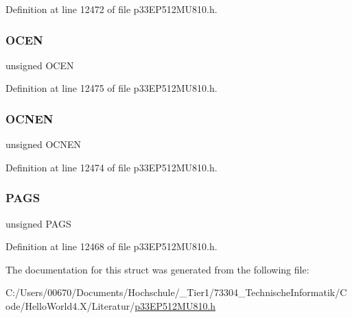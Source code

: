 Definition at line 12472 of file p33\+E\+P512\+M\+U810.\+h.

\mbox{\label{structtag_c_m2_m_s_k_c_o_n_b_i_t_s_ad7c118cfef34dec7ba06f5968b47200c}} 
\subsubsection{\texorpdfstring{O\+C\+EN}{OCEN}}
{\footnotesize\ttfamily unsigned O\+C\+EN}



Definition at line 12475 of file p33\+E\+P512\+M\+U810.\+h.

\mbox{\label{structtag_c_m2_m_s_k_c_o_n_b_i_t_s_a8bee27f84106873154bb0f1b9d244ebd}} 
\subsubsection{\texorpdfstring{O\+C\+N\+EN}{OCNEN}}
{\footnotesize\ttfamily unsigned O\+C\+N\+EN}



Definition at line 12474 of file p33\+E\+P512\+M\+U810.\+h.

\mbox{\label{structtag_c_m2_m_s_k_c_o_n_b_i_t_s_af5feed07d2e415c635200336f0f05e41}} 
\subsubsection{\texorpdfstring{P\+A\+GS}{PAGS}}
{\footnotesize\ttfamily unsigned P\+A\+GS}



Definition at line 12468 of file p33\+E\+P512\+M\+U810.\+h.



The documentation for this struct was generated from the following file\+:\begin{DoxyCompactItemize}
\item 
C\+:/\+Users/00670/\+Documents/\+Hochschule/\+\_\+\+Tier1/73304\+\_\+\+Technische\+Informatik/\+Code/\+Hello\+World4.\+X/\+Literatur/\hyperlink{p33_e_p512_m_u810_8h}{p33\+E\+P512\+M\+U810.\+h}\end{DoxyCompactItemize}
